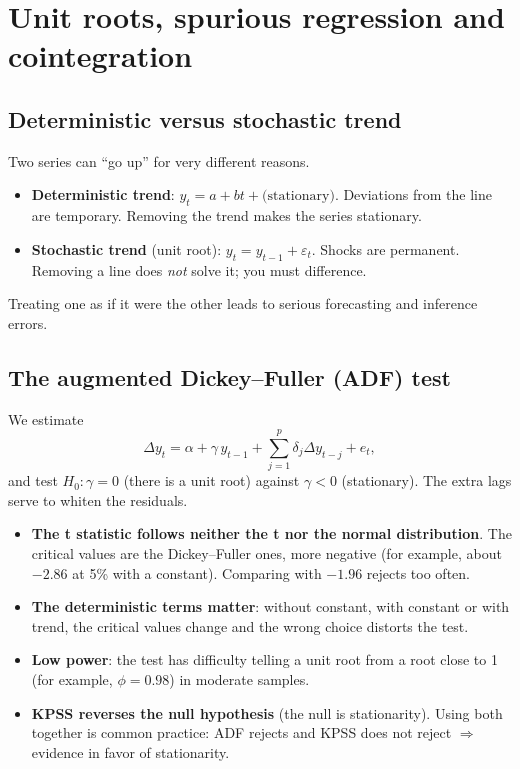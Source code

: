 \chapter{Unit roots, spurious regression and cointegration}
\label{cap:ur}

\section{Deterministic versus stochastic trend}
Two series can ``go up'' for very different reasons.
\begin{itemize}[leftmargin=1.4em]
\item \textbf{Deterministic trend}: $y_t=a+bt+\text{(stationary)}$. Deviations from the line are temporary. Removing the trend makes the series stationary.
\item \textbf{Stochastic trend} (unit root): $y_t=y_{t-1}+\varepsilon_t$. Shocks are permanent. Removing a line does \emph{not} solve it; you must difference.
\end{itemize}
Treating one as if it were the other leads to serious forecasting and inference errors.

\section{The augmented Dickey--Fuller (ADF) test}
We estimate
\[
\Delta y_t=\alpha+\gamma\,y_{t-1}+\sum_{j=1}^{p}\delta_j\Delta y_{t-j}+e_t,
\]
and test $H_0:\gamma=0$ (there is a unit root) against $\gamma<0$ (stationary). The extra lags serve to whiten the residuals.

\begin{atencao}
\begin{itemize}[leftmargin=1.2em]
\item \textbf{The t statistic follows neither the t nor the normal distribution}. The critical values are the Dickey--Fuller ones, more negative (for example, about $-2.86$ at 5\% with a constant). Comparing with $-1.96$ rejects too often.
\item \textbf{The deterministic terms matter}: without constant, with constant or with trend, the critical values change and the wrong choice distorts the test.
\item \textbf{Low power}: the test has difficulty telling a unit root from a root close to 1 (for example, $\phi=0.98$) in moderate samples.
\item \textbf{KPSS reverses the null hypothesis} (the null is stationarity). Using both together is common practice: ADF rejects and KPSS does not reject $\Rightarrow$ evidence in favor of stationarity.
\end{itemize}
\end{atencao}

